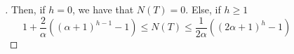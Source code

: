 \documentclass{beamer}
\begin{document}
\begin{frame}
\begin{columns}
\begin{column}{\textlecolumn}
\begin{block}{}
                \begin{proof}[\unskip\nopunct]
                    Then, if \(h = 0\), we have that \(N\left(T\right) = 0\). Else, if \(h \geq 1\)
                    \[
                        1 + \frac{2}{\alpha}\left(\left(\alpha + 1\right)^{h - 1} - 1\right) 
                        \leq 
                        N\left(T\right) 
                        \leq 
                        \frac{1}{2\alpha}\left(\left(2\alpha + 1\right)^{h} - 1\right)
                        \tag{Nodes Bounds}\label{btree-nodes-num}
                    \]
                \end{proof}
            \end{block}
        \end{column}
        \begin{column}{\textricolumn}
        \end{column}
    \end{columns}
\end{frame}
\end{document}
